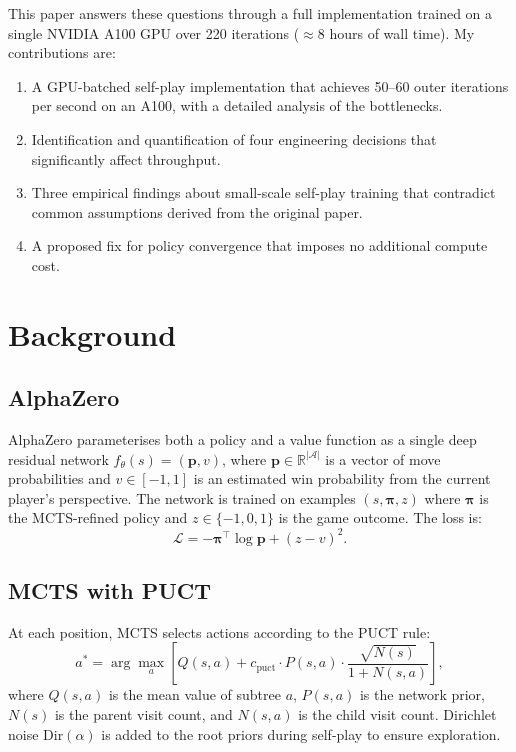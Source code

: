 \documentclass[conference]{IEEEtran}
\begin{document}
This paper answers these questions through a full implementation trained on a
single NVIDIA A100 GPU over 220 iterations ($\approx$8 hours of wall time).
My contributions are:

\begin{enumerate}
\item A GPU-batched self-play implementation that achieves 50--60 outer
  iterations per second on an A100, with a detailed analysis of the bottlenecks.
\item Identification and quantification of four engineering decisions that
  significantly affect throughput.
\item Three empirical findings about small-scale self-play training that
  contradict common assumptions derived from the original paper.
\item A proposed fix for policy convergence that imposes no additional compute
  cost.
\end{enumerate}

\section{Background}

\subsection{AlphaZero}

AlphaZero \cite{silver2017mastering} parameterises both a policy and a value
function as a single deep residual network $f_\theta(s) = (\mathbf{p}, v)$,
where $\mathbf{p} \in \mathbb{R}^{|\mathcal{A}|}$ is a vector of move
probabilities and $v \in [-1, 1]$ is an estimated win probability from the
current player's perspective. The network is trained on examples
$(s, \boldsymbol{\pi}, z)$ where $\boldsymbol{\pi}$ is the MCTS-refined policy
and $z \in \{-1, 0, 1\}$ is the game outcome. The loss is:
\begin{equation}
  \mathcal{L} = -\boldsymbol{\pi}^\top \log \mathbf{p} + (z - v)^2.
\end{equation}

\subsection{MCTS with PUCT}

At each position, MCTS selects actions according to the PUCT rule:
\begin{equation}
  a^* = \arg\max_a \left[ Q(s,a) + c_\text{puct} \cdot P(s,a)
        \cdot \frac{\sqrt{N(s)}}{1 + N(s,a)} \right],
\end{equation}
where $Q(s,a)$ is the mean value of subtree $a$, $P(s,a)$ is the network prior,
$N(s)$ is the parent visit count, and $N(s,a)$ is the child visit count.
Dirichlet noise $\text{Dir}(\alpha)$ is added to the root priors during
self-play to ensure exploration.
\end{document}
